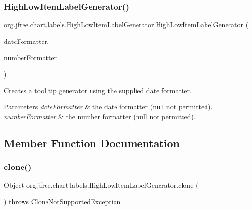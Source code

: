 \subsubsection{\texorpdfstring{High\+Low\+Item\+Label\+Generator()}{HighLowItemLabelGenerator()}\hspace{0.1cm}{\footnotesize\ttfamily [2/2]}}
{\footnotesize\ttfamily org.\+jfree.\+chart.\+labels.\+High\+Low\+Item\+Label\+Generator.\+High\+Low\+Item\+Label\+Generator (\begin{DoxyParamCaption}\item[{Date\+Format}]{date\+Formatter,  }\item[{Number\+Format}]{number\+Formatter }\end{DoxyParamCaption})}

Creates a tool tip generator using the supplied date formatter.


\begin{DoxyParams}{Parameters}
{\em date\+Formatter} & the date formatter ({\ttfamily null} not permitted). \\
\hline
{\em number\+Formatter} & the number formatter ({\ttfamily null} not permitted). \\
\hline
\end{DoxyParams}


\subsection{Member Function Documentation}
\mbox{\label{classorg_1_1jfree_1_1chart_1_1labels_1_1_high_low_item_label_generator_ab18c4069d475adbf4f4b6c68983bc7c6}} 
\subsubsection{\texorpdfstring{clone()}{clone()}}
{\footnotesize\ttfamily Object org.\+jfree.\+chart.\+labels.\+High\+Low\+Item\+Label\+Generator.\+clone (\begin{DoxyParamCaption}{ }\end{DoxyParamCaption}) throws Clone\+Not\+Supported\+Exception}

